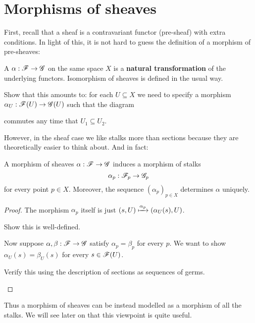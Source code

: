 \section{Morphisms of sheaves}
First, recall that a sheaf is a contravariant functor (pre-sheaf)
with extra conditions. In light of this, it is not hard to guess
the definition of a morphism of pre-sheaves:
\begin{definition}
	A  $\alpha : \mathscr F \to \mathscr G$ on the same
	space $X$ is a \textbf{natural transformation} of the underlying functors.
	Isomorphism of sheaves is defined in the usual way.
\end{definition}
\begin{ques}
	Show that this amounts to: for each $U \subseteq X$ we need to specify
	a morphism $\alpha_U : \mathscr F(U) \to \mathscr G(U)$ such that the diagram
	\begin{center}
	\end{center}
	commutes any time that $U_1 \subseteq U_2$.
\end{ques}
However, in the sheaf case we like stalks more than sections because
they are theoretically easier to think about.
And in fact:
\begin{proposition}
	A morphism of sheaves $\alpha : \mathscr F \to \mathscr G$ induces a morphism of stalks
	\[ \alpha_p : \mathscr F_p \to \mathscr G_p \]
	for every point $p \in X$.
	Moreover, the sequence $(\alpha_p)_{p \in X}$ determines $\alpha$ uniquely.
\end{proposition}
\begin{proof}
	The morphism $\alpha_p$ itself is just
	$(s, U) \xmapsto{\alpha_p} (\alpha_U(s), U)$.
	\begin{ques}
		Show this is well-defined.
	\end{ques}
	Now suppose $\alpha , \beta : \mathscr F \to \mathscr G$ satisfy $\alpha_p = \beta_p$
	for every $p$. We want to show $\alpha_U(s) = \beta_U(s)$
	for every $s \in \mathscr F(U)$.
	\begin{ques}
		Verify this using the description of sections
		as sequences of germs. \qedhere
	\end{ques}
\end{proof}
Thus a morphism of sheaves can be instead modelled as a morphism
of all the stalks. We will see later on that this viewpoint is quite useful.

